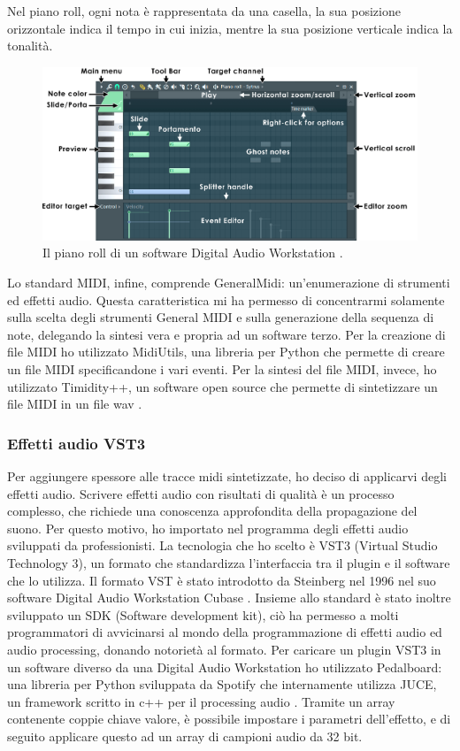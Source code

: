 Nel piano roll, ogni nota è rappresentata da una casella, la sua posizione orizzontale indica il tempo in cui inizia, mentre la sua posizione verticale indica la tonalità.
\begin{figure}[H]
    \includegraphics[width=\linewidth,scale=0.2]{img/pianoroll.png}
    \caption{Il piano roll di un software Digital Audio Workstation \cite{pianoroll_img}.}
    \label{fig:pianoroll}
\end{figure}
Lo standard MIDI, infine, comprende GeneralMidi: un'enumerazione di strumenti ed effetti audio.
Questa caratteristica mi ha permesso di concentrarmi solamente sulla scelta degli strumenti General MIDI e sulla generazione della sequenza di note, delegando la sintesi vera e propria ad un software terzo.
Per la creazione di file MIDI ho utilizzato MidiUtils, una libreria per Python che permette di creare un file MIDI specificandone i vari eventi.
Per la sintesi del file MIDI, invece, ho utilizzato Timidity++, un software open source che permette di sintetizzare un file MIDI in un file wav \cite{timidity}.
\subsubsection{Effetti audio VST3}
Per aggiungere spessore alle tracce midi sintetizzate, ho deciso di applicarvi degli effetti audio.
Scrivere effetti audio con risultati di qualità è un processo complesso, che richiede una conoscenza approfondita della propagazione del suono.
Per questo motivo, ho importato nel programma degli effetti audio sviluppati da professionisti.
La tecnologia che ho scelto è VST3 (Virtual Studio Technology 3), un formato che standardizza l'interfaccia tra il plugin e il software che lo utilizza.
Il formato VST è stato introdotto da Steinberg nel 1996 nel suo software Digital Audio Workstation Cubase \cite{vst3}. Insieme allo standard è stato inoltre sviluppato un SDK (Software development kit), ciò ha permesso a molti programmatori
di avvicinarsi al mondo della programmazione di effetti audio ed audio processing, donando notorietà al formato.
Per caricare un plugin VST3 in un software diverso da una Digital Audio Workstation ho utilizzato Pedalboard: una libreria per Python sviluppata da Spotify che internamente utilizza JUCE, un framework scritto in c++ per il processing audio \cite{juce}.
Tramite un array contenente coppie chiave valore, è possibile impostare i parametri dell'effetto, e di seguito applicare questo ad un array di campioni audio da 32 bit.
